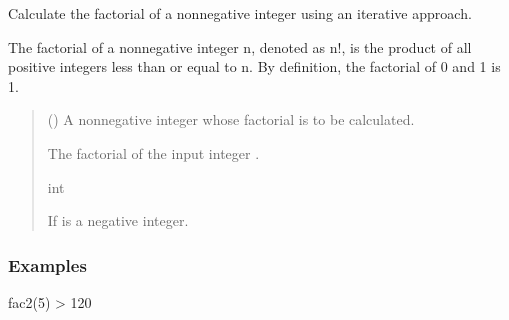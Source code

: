 \documentclass[letterpaper,10pt,english]{sphinxmanual}
\begin{document}
\begin{fulllineitems}
\label{\detokenize{chapter4:chapter4.fac.fac2}}
\pysigstartsignatures
{}
\pysigstopsignatures
\sphinxAtStartPar
Calculate the factorial of a non\sphinxhyphen{}negative integer  using an iterative approach.

\sphinxAtStartPar
The factorial of a non\sphinxhyphen{}negative integer n, denoted as n!, is the product of all
positive integers less than or equal to n. By definition, the factorial of 0 and 1 is 1.
\begin{quote}\begin{description}
\sphinxAtStartPar
{} () \textendash{} A non\sphinxhyphen{}negative integer whose factorial is to be calculated.

\sphinxAtStartPar
The factorial of the input integer .

\sphinxAtStartPar
int

\sphinxAtStartPar
{} \textendash{} If  is a negative integer.

\end{description}\end{quote}
\subsubsection*{Examples}

\sphinxAtStartPar
fac2(5) \sphinxhyphen{}\textgreater{} 120

\end{fulllineitems}


\begin{fulllineitems}
\label{\detokenize{chapter4:chapter4.fac.fac3}}
\pysigstartsignatures
{}
\pysigstopsignatures
\end{fulllineitems}
\end{document}
